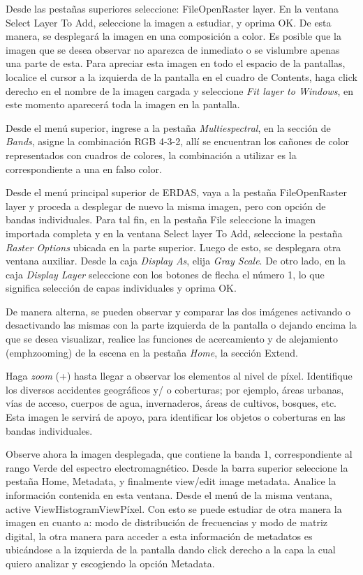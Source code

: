 \documentclass[a4paper,oneside,11pt,]{article}
\begin{document}
Desde las pestañas superiores seleccione: File\textrightarrow Open\textrightarrow Raster layer. En la ventana Select Layer To Add, seleccione la imagen a estudiar, y oprima OK. De esta manera, se desplegará la imagen en una composición a color. 
Es posible que la imagen que se desea observar no aparezca de inmediato o se vislumbre apenas una parte de esta. Para apreciar esta imagen en todo el espacio de la pantallas, localice el cursor a la izquierda de la pantalla en el cuadro de Contents, haga click derecho en el nombre de la imagen cargada y seleccione \emph{Fit layer to Windows}, en este momento aparecerá toda la imagen en la pantalla.
\par Desde el menú superior, ingrese a la pestaña \emph{Multiespectral}, en la sección de  \emph{Bands},  asigne la combinación RGB 4-3-2, allí se encuentran los cañones de color representados con cuadros de colores, la combinación a utilizar es la correspondiente a una  en falso color.
\par Desde el menú principal superior de  ERDAS, vaya a la pestaña File\textrightarrow Open\textrightarrow Raster layer y proceda a desplegar de nuevo la misma imagen, pero con opción de bandas individuales. Para tal fin, en la pestaña File seleccione la imagen importada completa y en la ventana Select layer To Add, seleccione la pestaña \emph{Raster Options} ubicada en la parte superior. Luego de esto, se desplegara otra ventana auxiliar. Desde la caja \emph{Display As}, elija \emph{Gray Scale}. De otro lado, en la caja \emph{Display Layer} seleccione con los botones de flecha el número 1, lo que significa selección de capas individuales y oprima OK.
\par De manera alterna, se pueden observar y comparar las dos imágenes activando o desactivando las mismas con la parte izquierda de la pantalla o dejando encima la que se desea visualizar, realice las funciones de acercamiento y de alejamiento (emph{zooming}) de la escena  en la pestaña \emph{Home}, la sección Extend.
\par Haga \emph{zoom} (+) hasta llegar a observar los elementos al nivel de píxel.  Identifique los diversos accidentes geográficos y/ o coberturas; por ejemplo, áreas urbanas, vías de acceso, cuerpos de agua, invernaderos, áreas de cultivos, bosques, etc. Esta imagen le servirá de apoyo, para identificar los objetos o coberturas en las bandas individuales.
\par Observe ahora la imagen desplegada, que contiene la banda 1, correspondiente al rango Verde del espectro electromagnético. Desde la barra superior seleccione la pestaña Home, Metadata, y finalmente view/edit image metadata. Analice la información contenida en esta ventana. Desde el menú de la misma ventana, active View\textrightarrow Histogram\textrightarrow View\textrightarrow Píxel. Con esto se puede estudiar de otra manera la imagen en cuanto a: modo de distribución de frecuencias y modo de matriz digital, la otra manera para acceder a esta información de metadatos es ubicándose a la izquierda de la pantalla dando click derecho a la capa la cual quiero analizar y escogiendo la opción Metadata.
\end{document}
